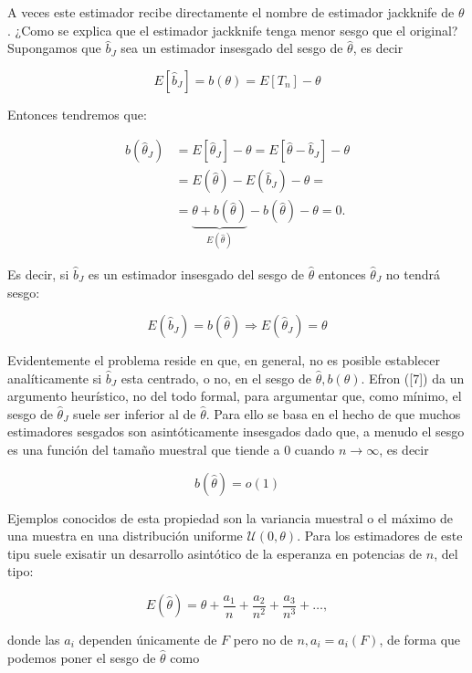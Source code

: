 \documentclass[
]{article}
\begin{document}
A veces este estimador recibe directamente el nombre de estimador jackknife de \(\theta\).
¿Como se explica que el estimador jackknife tenga menor sesgo que el original? Supongamos que \(\hat{b}_{J}\) sea un estimador insesgado del sesgo de \(\hat{\theta}\), es decir

\[
E\left[\hat{b}_{J}\right]=b(\theta)=E\left[T_{n}\right]-\theta
\]

Entonces tendremos que:

\[
\begin{aligned}
b\left(\hat{\theta}_{J}\right) & =E\left[\hat{\theta}_{J}\right]-\theta=E\left[\hat{\theta}-\hat{b}_{J}\right]-\theta \\
& =E(\hat{\theta})-E\left(\hat{b}_{J}\right)-\theta= \\
& =\underbrace{\theta+b(\hat{\theta})}_{E(\hat{\theta})}-b(\hat{\theta})-\theta=0 .
\end{aligned}
\]

Es decir, si \(\hat{b}_{J}\) es un estimador insesgado del sesgo de \(\hat{\theta}\) entonces \(\hat{\theta}_{J}\) no tendrá sesgo:

\[
E\left(\hat{b}_{J}\right)=b(\hat{\theta}) \Longrightarrow E\left(\hat{\theta}_{J}\right)=\theta
\]

Evidentemente el problema reside en que, en general, no es posible establecer analíticamente si \(\hat{b}_{J}\) esta centrado, o no, en el sesgo de \(\hat{\theta}, b(\theta)\). Efron ({[}7{]}) da un argumento heurístico, no del todo formal, para argumentar que, como mínimo, el sesgo de \(\hat{\theta}_{J}\) suele ser inferior al de \(\hat{\theta}\). Para ello se basa en el hecho de que muchos estimadores sesgados son asintóticamente insesgados dado que, a menudo el sesgo es una función del tamaño muestral que tiende a 0 cuando \(n \longrightarrow \infty\), es decir

\[
b(\hat{\theta})=o(1)
\]

Ejemplos conocidos de esta propiedad son la variancia muestral o el máximo de una muestra en una distribución uniforme \(\mathcal{U}(0, \theta)\). Para los estimadores de este tipu suele exisatir un desarrollo asintótico de la esperanza en potencias de \(n\), del tipo:

\[
E(\hat{\theta})=\theta+\frac{a_{1}}{n}+\frac{a_{2}}{n^{2}}+\frac{a_{3}}{n^{3}}+\ldots,
\]

donde las \(a_{i}\) dependen únicamente de \(F\) pero no de \(n, a_{i}=a_{i}(F)\), de forma que podemos poner el sesgo de \(\hat{\theta}\) como
\end{document}
